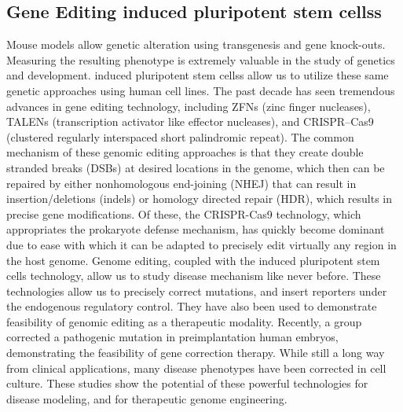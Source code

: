 \documentclass[sigconf]{acmart}
\begin{document}
\subsection{Gene Editing  induced pluripotent stem cellss}
Mouse models allow genetic alteration using transgenesis and gene knock-outs.
Measuring the resulting phenotype is extremely valuable in the study of genetics and
development.  induced pluripotent stem cellss allow us to utilize these same genetic approaches using human cell lines.
The past decade has seen tremendous advances in gene editing technology, including ZFNs (zinc
finger nucleases), TALENs (transcription activator like effector nucleases), and CRISPR–Cas9
(clustered regularly interspaced short palindromic repeat). The common mechanism of
these genomic editing approaches is that they create double stranded breaks (DSBs) at desired
locations in the genome, which then can be repaired by either nonhomologous end-joining
(NHEJ) that can result in insertion/deletions (indels) or homology directed repair (HDR), which
results in precise gene modifications. Of these, the CRISPR-Cas9 technology, which
appropriates the prokaryote defense mechanism, has quickly become dominant due to ease with
which it can be adapted to precisely edit virtually any region in the host genome. 
Genome editing, coupled with the  induced pluripotent stem cells technology, allow us to study disease mechanism like never before. These technologies allow us to precisely correct mutations, and insert reporters under the endogenous regulatory control. They have also been used to demonstrate feasibility of genomic editing as a therapeutic modality. Recently, a group corrected a pathogenic mutation in preimplantation human embryos, demonstrating the feasibility of gene correction therapy. While still a long way from clinical applications, many disease phenotypes have been corrected in cell culture. These studies show the potential of these powerful technologies for disease modeling, and for therapeutic genome engineering.
\end{document}
